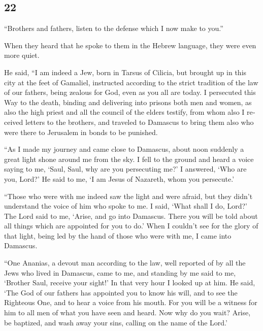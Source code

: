 \begin{paracol}{2}
\switchcolumn
\begin{otherlanguage}{english}

\hypertarget{section-43}{%
\section{22}\label{section-43}}

 ``Brothers and fathers, listen to the defense which I now
make to you.''

 When they heard that he spoke to them in the Hebrew
language, they were even more quiet.

He said,  ``I am indeed a Jew, born in Tarsus of Cilicia,
but brought up in this city at the feet of Gamaliel, instructed
according to the strict tradition of the law of our fathers, being
zealous for God, even as you all are today.  I persecuted
this Way to the death, binding and delivering into prisons both men and
women,  as also the high priest and all the council of the
elders testify, from whom also I received letters to the brothers, and
traveled to Damascus to bring them also who were there to Jerusalem in
bonds to be punished.

 ``As I made my journey and came close to Damascus, about
noon suddenly a great light shone around me from the sky. 
I fell to the ground and heard a voice saying to me, `Saul, Saul, why
are you persecuting me?'  I answered, `Who are you, Lord?'
He said to me, `I am Jesus of Nazareth, whom you persecute.'

 ``Those who were with me indeed saw the light and were
afraid, but they didn't understand the voice of him who spoke to me.
 I said, `What shall I do, Lord?' The Lord said to me,
`Arise, and go into Damascus. There you will be told about all things
which are appointed for you to do.'  When I couldn't see
for the glory of that light, being led by the hand of those who were
with me, I came into Damascus.

 ``One Ananias, a devout man according to the law, well
reported of by all the Jews who lived in Damascus,  came
to me, and standing by me said to me, `Brother Saul, receive your
sight!' In that very hour I looked up at him.  He said,
`The God of our fathers has appointed you to know his will, and to see
the Righteous One, and to hear a voice from his mouth. 
For you will be a witness for him to all men of what you have seen and
heard.  Now why do you wait? Arise, be baptized, and wash
away your sins, calling on the name of the Lord.'


\end{otherlanguage}
\end{paracol}
